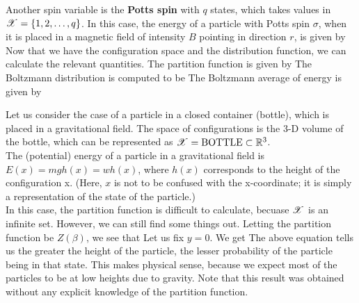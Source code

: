 \documentclass[letterpaper,english,10pt]{article}
\begin{document}
\begin{shaded*} 
\begin{exmp}
Another spin variable is the \textbf{Potts spin} with $q$ states, 
which takes values in $\mathscr{X}=\{1,2,\ldots,q\}$. 
In this case, the energy of a particle with Potts spin $\sigma$, 
when it is placed in a magnetic field of intensity $B$ pointing in direction $r$, 
is given by 
Now that we have the configuration space and the distribution function, we can calculate the relevant quantities. 
The partition function is given by 
The Boltzmann distribution is computed to be 
The Boltzmann average of energy is given by 
\end{exmp}
\end{shaded*}
\begin{shaded*} 
\begin{exmp}
Let us consider the case of a particle in a closed container (bottle), which is placed in a gravitational field. The space of configurations is the 3-D volume of the bottle, which can be represented as $\mathscr{X}=\text{BOTTLE}\subset \mathbb{R}^3$. \\
The (potential) energy of a particle in a gravitational field is $E(x)=mg h(x)=w h(x)$, where $h(x)$ corresponds to the height of the configuration x. (Here, $x$ is not to be confused with the x-coordinate; it is simply a representation of the state of the particle.) \\
In this case, the partition function is difficult to calculate, becuase $\mathscr{X}$ is an infinite set. However, we can still find some things out. Letting the partition function be $Z(\beta)$, we see that
Let us fix $y=0$. We get 
The above equation tells us the greater the height of the particle, the lesser probability of the particle being in that state. This makes physical sense, because we expect most of the particles to be at low heights due to gravity. Note that this result was obtained without any explicit knowledge of the partition function. 
\end{exmp}
\end{shaded*}
\end{document}
